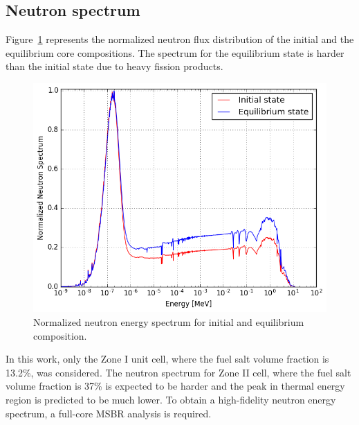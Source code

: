 \documentclass{anstrans}
\begin{document}
\subsection{Neutron spectrum}

Figure~\ref{fig:spectrum} represents the normalized neutron flux distribution 
of the initial and the equilibrium core compositions. The spectrum for the 
equilibrium state is harder than the initial state due to heavy fission 
products.  
\begin{figure}[htbp!] %
        \centering
        \includegraphics[width=1.04\linewidth]{spectrum.png}
        \caption{Normalized neutron energy spectrum for initial and equilibrium 
        composition.}
        \label{fig:spectrum}
\end{figure}

\FloatBarrier 

In this work, only the Zone I unit cell, where the fuel salt volume fraction is 
13.2\%, was considered. The neutron spectrum for Zone II cell, where the fuel 
salt volume fraction is 37\% is expected to be harder and the peak in thermal 
energy region is predicted to be much 
lower. To obtain a high-fidelity neutron energy spectrum, a full-core \gls{MSBR}
analysis is required.
\end{document}
